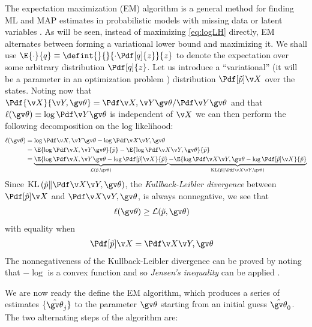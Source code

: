 The expectation maximization (EM) algorithm \parencite{Dempster1977} is a general
method for finding ML and MAP estimates in probabilistic models with missing data or
latent variables \parencite{Bishop2006,barber2012bayesian}. As will be seen, instead of maximizing
\eqref{eq:logLH} directly, EM alternates between forming a variational lower bound and maximizing it.
We shall use $\E{\cdot}{q}\equiv\defint{}{}{\cdot \Pdf[q]{z}}{z}$ to denote the expectation
over some arbitrary distribution $\Pdf[q]{z}$.
Let us introduce a ``variational'' (it will be a parameter in an optimization problem \parencite{barber2012bayesian}) 
distribution $\tPX$ over the states. 
Noting now that $\Pdf{\X}{\Y,\Th}=\cLH/\LH$ and that $\lLH\equiv\log\LH$ is independent of $\X$ we can then perform the
following decomposition on the log likelihood:
\begin{align}
	\lLH &= \lcLH - \log\post \nonumber\\
	&= \E{\lcLH}{\tP} - \E{\log\post}{\tP} \nonumber\\
	&= \underbrace{\E{\lcLH-\log\tPX}{\tP}}_{\LB\left(\tP,\Th\right)}
	\underbrace{-\E{\log\post-\log\tPX}{\tP}}_{\KL{\tP}{\post}}
	\label{eq:lLH_decomp}
\end{align}
Since $\KL{\tP}{\post}$, the \emph{Kullback-Leibler divergence} between $\tPX$ and $\post$, is always nonnegative,
we see that 
\begin{align}
	\lLH&\geq \LB(\tP,\Th) \label{eq:em_lh_lb}
\end{align}
with equality when 
\begin{align}
	\tPX &= \post \label{eq:em_maxq}
\end{align}
The nonnegativeness of the Kullback-Leibler divergence can be proved by
noting that $-\log$ is a convex function and so \emph{Jensen's inequality}
can be applied \parencite{Bishop2006}.

We are now ready the define the EM algorithm, which produces
a series of estimates $\{\hat{\Th}_j\}$ to the parameter $\Th$
starting from an initial guess $\hat{\Th}_0$. The two alternating
steps of the algorithm are:

